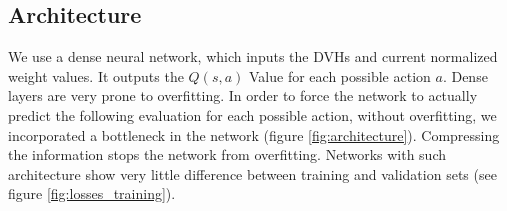 %
%
%
%
%
%


\subsection{Architecture}
We use a dense neural network, which inputs the DVHs and current normalized weight values.
It outputs the $Q(s, a)$ Value for each possible action $a$.
Dense layers are very prone to overfitting.
In order to force the network to actually predict the following evaluation for each possible action, without overfitting, we incorporated a bottleneck in the network (figure \ref{fig:architecture}).
Compressing the information stops the network from overfitting.
Networks with such architecture show very little difference between training and validation sets (see figure \ref{fig:losses_training}).

